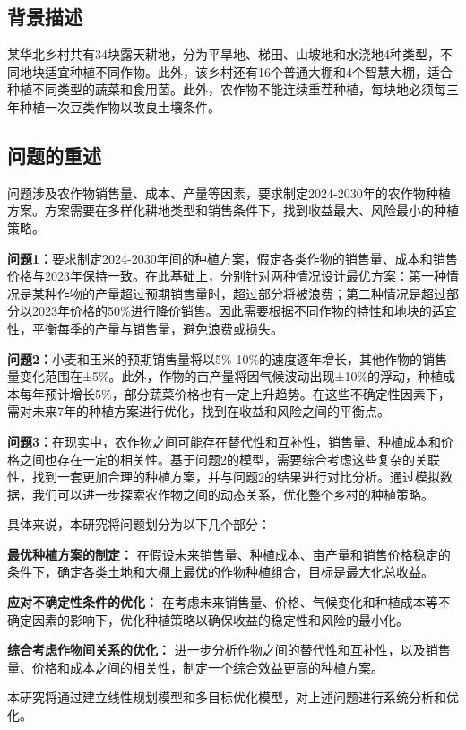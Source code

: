 \documentclass[withoutpreface]{cumcmthesis}
\begin{document}
\subsection{背景描述}
某华北乡村共有34块露天耕地，分为平旱地、梯田、山坡地和水浇地4种类型，不同地块适宜种植不同作物。此外，该乡村还有16个普通大棚和4个智慧大棚，适合种植不同类型的蔬菜和食用菌。此外，农作物不能连续重茬种植，每块地必须每三年种植一次豆类作物以改良土壤条件。
\subsection{问题的重述}
问题涉及农作物销售量、成本、产量等因素，要求制定2024-2030年的农作物种植方案。方案需要在多样化耕地类型和销售条件下，找到收益最大、风险最小的种植策略。

\textbf{问题1：}要求制定2024-2030年间的种植方案，假定各类作物的销售量、成本和销售价格与2023年保持一致。在此基础上，分别针对两种情况设计最优方案：第一种情况是某种作物的产量超过预期销售量时，超过部分将被浪费；第二种情况是超过部分以2023年价格的50\%进行降价销售。因此需要根据不同作物的特性和地块的适宜性，平衡每季的产量与销售量，避免浪费或损失。

\textbf{问题2：}小麦和玉米的预期销售量将以5\%-10\%的速度逐年增长，其他作物的销售量变化范围在±5\%。此外，作物的亩产量将因气候波动出现±10\%的浮动，种植成本每年预计增长5\%，部分蔬菜价格也有一定上升趋势。在这些不确定性因素下，需对未来7年的种植方案进行优化，找到在收益和风险之间的平衡点。

\textbf{问题3：}在现实中，农作物之间可能存在替代性和互补性，销售量、种植成本和价格之间也存在一定的相关性。基于问题2的模型，需要综合考虑这些复杂的关联性，找到一套更加合理的种植方案，并与问题2的结果进行对比分析。通过模拟数据，我们可以进一步探索农作物之间的动态关系，优化整个乡村的种植策略。

具体来说，本研究将问题划分为以下几个部分：

\textbf{最优种植方案的制定：} 在假设未来销售量、种植成本、亩产量和销售价格稳定的条件下，确定各类土地和大棚上最优的作物种植组合，目标是最大化总收益。

\textbf{应对不确定性条件的优化：} 在考虑未来销售量、价格、气候变化和种植成本等不确定因素的影响下，优化种植策略以确保收益的稳定性和风险的最小化。

\textbf{综合考虑作物间关系的优化：} 进一步分析作物之间的替代性和互补性，以及销售量、价格和成本之间的相关性，制定一个综合效益更高的种植方案。


本研究将通过建立线性规划模型和多目标优化模型，对上述问题进行系统分析和优化。
\end{document}
